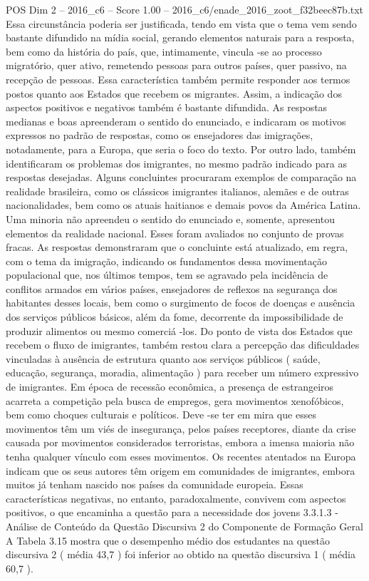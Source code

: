 \begin{textsample}{POS Dim 2 – 2016\_c6 – Score 1.00 – 2016\_c6/enade\_2016\_zoot\_f32beec87b.txt}
Essa circunstância poderia ser justificada, tendo em vista que o tema vem sendo bastante difundido na mídia social, gerando elementos naturais para a resposta, bem como da história do país, que, intimamente, vincula -se ao processo migratório, quer ativo, remetendo pessoas para outros países, quer passivo, na recepção de pessoas.
Essa característica também permite responder aos termos postos quanto aos Estados que recebem os migrantes.
Assim, a indicação dos aspectos positivos e negativos também é bastante difundida.
As respostas medianas e boas apreenderam o sentido do enunciado, e indicaram os motivos expressos no padrão de respostas, como os ensejadores das imigrações, notadamente, para a Europa, que seria o foco do texto.
Por outro lado, também identificaram os problemas dos imigrantes, no mesmo padrão indicado para as respostas desejadas.
Alguns concluintes procuraram exemplos de comparação na realidade brasileira, como os clássicos imigrantes italianos, alemães e de outras nacionalidades, bem como os atuais haitianos e demais povos da América Latina.
Uma minoria não apreendeu o sentido do enunciado e, somente, apresentou elementos da realidade nacional.
Esses foram avaliados no conjunto de provas fracas.
As respostas demonstraram que o concluinte está atualizado, em regra, com o tema da imigração, indicando os fundamentos dessa movimentação populacional que, nos últimos tempos, tem se agravado pela incidência de conflitos armados em vários países, ensejadores de reflexos na segurança dos habitantes desses locais, bem como o surgimento de focos de doenças e ausência dos serviços públicos básicos, além da fome, decorrente da impossibilidade de produzir alimentos ou mesmo comerciá -los.
Do ponto de vista dos Estados que recebem o fluxo de imigrantes, também restou clara a percepção das dificuldades vinculadas à ausência de estrutura quanto aos serviços públicos ( saúde, educação, segurança, moradia, alimentação ) para receber um número expressivo de imigrantes.
Em época de recessão econômica, a presença de estrangeiros acarreta a competição pela busca de empregos, gera movimentos xenofóbicos, bem como choques culturais e políticos.
Deve -se ter em mira que esses movimentos têm um viés de insegurança, pelos países receptores, diante da crise causada por movimentos considerados terroristas, embora a imensa maioria não tenha qualquer vínculo com esses movimentos.
Os recentes atentados na Europa indicam que os seus autores têm origem em comunidades de imigrantes, embora muitos já tenham nascido nos países da comunidade europeia.
Essas características negativas, no entanto, paradoxalmente, convivem com aspectos positivos, o que encaminha a questão para a necessidade dos jovens 3.3.1.3 - Análise de Conteúdo da Questão Discursiva 2 do Componente de Formação Geral A Tabela 3.15 mostra que o desempenho médio dos estudantes na questão discursiva 2 ( média 43,7 ) foi inferior ao obtido na questão discursiva 1 ( média 60,7 ).

\end{textsample}
